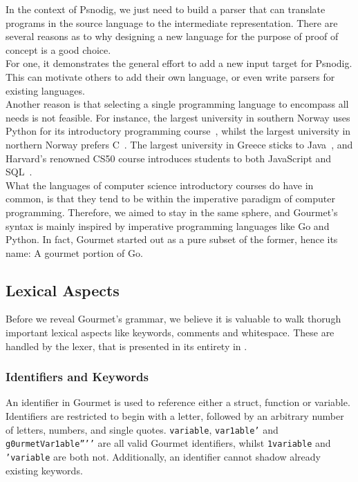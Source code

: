 In the context of Psnodig, we just need to build a parser that can translate programs in the source language to the intermediate representation. There are several reasons as to why designing a new language for the purpose of proof of concept is a good choice. \\

For one, it demonstrates the general effort to add a new input target for Psnodig. This can motivate others to add their own language, or even write parsers for existing languages. \\

Another reason is that selecting a single programming language to encompass all needs is not feasible. For instance, the largest university in southern Norway uses Python for its introductory programming course~\cite{pythonHosUIO}, whilst the largest university in northern Norway prefers C~\cite{cHosUIT}. The largest university in Greece sticks to Java~\cite{javaIHellas}, and Harvard's renowned CS50 course introduces students to both JavaScript and SQL~\cite{javaScriptOgSQLhosHarvard}. \\

What the languages of computer science introductory courses do have in common, is that they tend to be within the imperative paradigm of computer programming. Therefore, we aimed to stay in the same sphere, and Gourmet's syntax is mainly inspired by imperative programming languages like Go and Python. In fact, Gourmet started out as a pure subset of the former, hence its name: A gourmet portion of Go.

\subsection{Lexical Aspects}

Before we reveal Gourmet's grammar, we believe it is valuable to walk thorugh important lexical aspects like keywords, comments and whitespace. These are handled by the lexer, that is presented in its entirety in .

\subsubsection{Identifiers and Keywords}

An identifier in Gourmet is used to reference either a struct, function or variable. Identifiers are restricted to begin with a letter, followed by an arbitrary number of letters, numbers, and single quotes. \texttt{variable}, \texttt{var1able’} and \texttt{g0urmetVar1able''’'} are all valid Gourmet identifiers, whilst \texttt{1variable} and \texttt{'variable} are both not. Additionally, an identifier cannot shadow already existing keywords. \\

